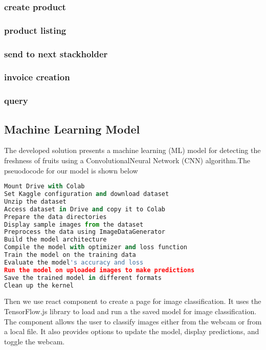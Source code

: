 \subsubsection{create product}

\subsubsection{product listing}

\subsubsection{send to next stackholder}

\subsubsection{invoice creation}

\subsubsection{query}

\subsection{Machine Learning Model}
\noindent The developed solution presents a machine learning (ML) model for detecting the freshness of fruits using a ConvolutionalNeural Network (CNN) algorithm.The pseuodocode for our model is shown below \par
\begin{lstlisting}[language=Python , caption=ML model]
Mount Drive with Colab
Set Kaggle configuration and download dataset
Unzip the dataset
Access dataset in Drive and copy it to Colab
Prepare the data directories
Display sample images from the dataset
Preprocess the data using ImageDataGenerator
Build the model architecture
Compile the model with optimizer and loss function
Train the model on the training data
Evaluate the model's accuracy and loss
Run the model on uploaded images to make predictions
Save the trained model in different formats
Clean up the kernel
\end{lstlisting}
\noindent Then we use react component to create a page for image classification. It uses the TensorFlow.js library to load and run a the saved model for image classification. The component allows the user to classify images either from the webcam or from a local file. It also provides options to update the model, display predictions, and toggle the webcam.
\noindent 








